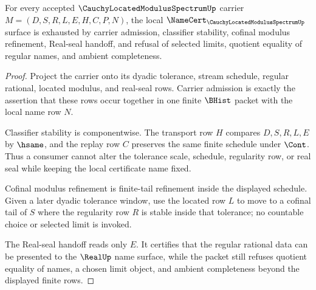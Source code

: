 \begin{theorem}
\label{thm:cauchy-located-modulus-spectrum-namecert-obligations}
For every accepted $\CauchyLocatedModulusSpectrumUp$ carrier $M=(D,S,R,L,E,H,C,P,N)$, the local $\NameCert_{\CauchyLocatedModulusSpectrumUp}$ surface is exhausted by carrier admission, classifier stability, cofinal modulus refinement, Real-seal handoff, and refusal of selected limits, quotient equality of regular names, and ambient completeness.
\end{theorem}
\begin{proof}
Project the carrier onto its dyadic tolerance, stream schedule, regular rational, located modulus, and real-seal rows. Carrier admission is exactly the assertion that these rows occur together in one finite $\BHist$ packet with the local name row $N$.

Classifier stability is componentwise. The transport row $H$ compares $D,S,R,L,E$ by $\hsame$, and the replay row $C$ preserves the same finite schedule under $\Cont$. Thus a consumer cannot alter the tolerance scale, schedule, regularity row, or real seal while keeping the local certificate name fixed.

Cofinal modulus refinement is finite-tail refinement inside the displayed schedule. Given a later dyadic tolerance window, use the located row $L$ to move to a cofinal tail of $S$ where the regularity row $R$ is stable inside that tolerance; no countable choice or selected limit is invoked.

The Real-seal handoff reads only $E$. It certifies that the regular rational data can be presented to the $\RealUp$ name surface, while the packet still refuses quotient equality of names, a chosen limit object, and ambient completeness beyond the displayed finite rows.
\end{proof}


\begin{closurestatus}{\CauchyLocatedModulusSpectrumUp}
  \theoryclosure{\seedClosure}
  \formalstatus{\unformalizedV}
\end{closurestatus}
